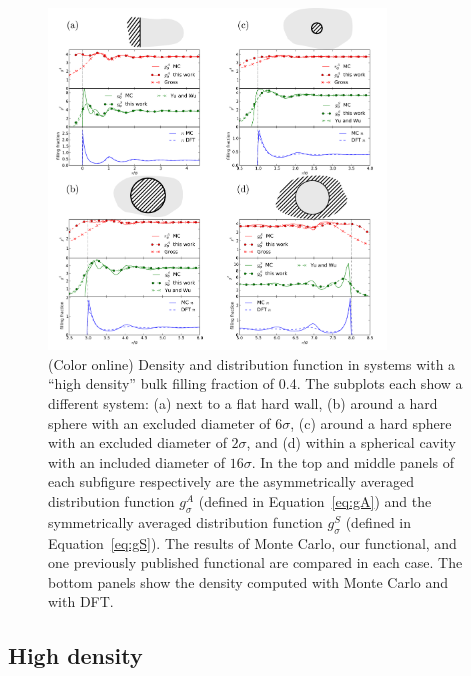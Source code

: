 \begin{figure}
  \noindent\includegraphics[width=0.8\textwidth]{figs/high-density}
  \caption{ (Color online) Density and distribution function in systems
    with a ``high density'' bulk filling fraction of 0.4.  The
    subplots each show a different system: (a) next to a flat hard wall, (b)
    around a hard sphere with an excluded diameter of $6\sigma$, (c)
    around a hard sphere with an excluded diameter of $2\sigma$, and
    (d) within a spherical cavity with an included diameter of $16\sigma$.
    In the top and middle panels of each subfigure respectively are the
    asymmetrically averaged distribution function $g_\sigma^A$ (defined
    in Equation~\ref{eq:gA}) and the symmetrically averaged
    distribution function $g_\sigma^S$ (defined in
    Equation~\ref{eq:gS}).  The results of Monte Carlo, our
    functional, and one previously published
    functional\cite{gross2009density,
      yu2002fmt-dft-inhomogeneous-associating} are compared in each
    case.  The bottom panels show the density computed with
    Monte Carlo and with DFT.}
  \label{fig:high-density}
\end{figure}

\subsection{High density}

